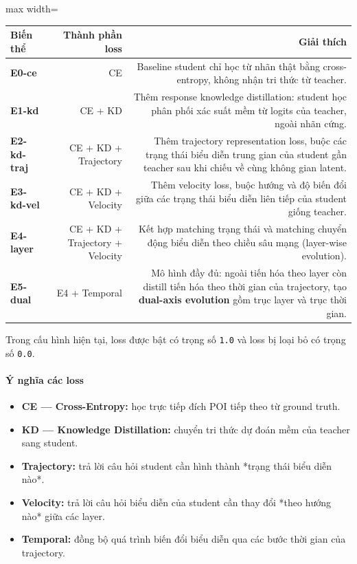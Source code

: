 \begin{table}[!htbp]
\centering
\scriptsize
\setlength{\tabcolsep}{2.5pt}
\begin{adjustbox}{max width=\textwidth}
\begin{tabular}{@{}lrr@{}}
\toprule
Biến thể & Thành phần loss & Giải thích \\
\midrule
\textbf{E0-ce} & CE & Baseline student chỉ học từ nhãn thật bằng cross-entropy, không nhận tri thức từ teacher. \\
\textbf{E1-kd} & CE + KD & Thêm response knowledge distillation: student học phân phối xác suất mềm từ logits của teacher, ngoài nhãn cứng. \\
\textbf{E2-kd-traj} & CE + KD + Trajectory & Thêm trajectory representation loss, buộc các trạng thái biểu diễn trung gian của student gần teacher sau khi chiếu về cùng không gian latent. \\
\textbf{E3-kd-vel} & CE + KD + Velocity & Thêm velocity loss, buộc hướng và độ biến đổi giữa các trạng thái biểu diễn liên tiếp của student giống teacher. \\
\textbf{E4-layer} & CE + KD + Trajectory + Velocity & Kết hợp matching trạng thái và matching chuyển động biểu diễn theo chiều sâu mạng (layer-wise evolution). \\
\textbf{E5-dual} & E4 + Temporal & Mô hình đầy đủ: ngoài tiến hóa theo layer còn distill tiến hóa theo thời gian của trajectory, tạo \textbf{dual-axis evolution} gồm trục layer và trục thời gian. \\
\bottomrule
\end{tabular}
\end{adjustbox}
\end{table}

Trong cấu hình hiện tại, loss được bật có trọng số \texttt{1.0} và loss bị loại bỏ có trọng số \texttt{0.0}.

\paragraph{Ý nghĩa các loss}

\begin{itemize}
\item \textbf{CE --- Cross-Entropy:} học trực tiếp đích POI tiếp theo từ ground truth.
\item \textbf{KD --- Knowledge Distillation:} chuyển tri thức dự đoán mềm của teacher sang student.
\item \textbf{Trajectory:} trả lời câu hỏi student cần hình thành *trạng thái biểu diễn nào*.
\item \textbf{Velocity:} trả lời câu hỏi biểu diễn của student cần thay đổi *theo hướng nào* giữa các layer.
\item \textbf{Temporal:} đồng bộ quá trình biến đổi biểu diễn qua các bước thời gian của trajectory.
\end{itemize}

